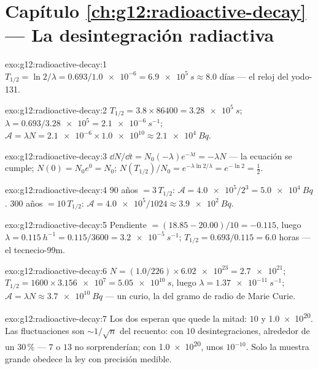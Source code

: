 \section*{Capítulo \ref{ch:g12:radioactive-decay} --- La desintegración radiactiva}

\begin{solution}{exo:g12:radioactive-decay:1}
$T_{1/2} = \ln 2/\lambda = 0.693/\num{1.0e-6} = \qty{6.9e5}{s} \approx
8.0$ días --- el reloj del yodo-131.
\end{solution}

\begin{solution}{exo:g12:radioactive-decay:2}
$T_{1/2} = 3.8 \times \num{86400} = \qty{3.28e5}{s}$;
$\lambda = 0.693/\num{3.28e5} = \qty{2.1e-6}{s^{-1}}$;
$\mathcal A = \lambda N = \num{2.1e-6} \times \num{1.0e10} \approx
\qty{2.1e4}{Bq}$.
\end{solution}

\begin{solution}{exo:g12:radioactive-decay:3}
$\dd N/\dd t = N_0(-\lambda)e^{-\lambda t} = -\lambda N$ --- la ecuación
se cumple; $N(0) = N_0 e^0 = N_0$;
$N(T_{1/2})/N_0 = e^{-\lambda \ln 2/\lambda} = e^{-\ln 2} = \tfrac12$.
\end{solution}

\begin{solution}{exo:g12:radioactive-decay:4}
$90$ años $= 3\,T_{1/2}$:
$\mathcal A = \num{4.0e5}/2^3 = \qty{5.0e4}{Bq}$. $300$ años
$= 10\,T_{1/2}$: $\mathcal A = \num{4.0e5}/1024 \approx
\qty{3.9e2}{Bq}$.
\end{solution}

\begin{solution}{exo:g12:radioactive-decay:5}
Pendiente $= (18.85 - 20.00)/10 = -0.115$, luego
$\lambda = \qty{0.115}{h^{-1}} = 0.115/3600 = \qty{3.2e-5}{s^{-1}}$;
$T_{1/2} = 0.693/0.115 = 6.0$ horas --- el tecnecio-99m.
\end{solution}

\begin{solution}{exo:g12:radioactive-decay:6}
$N = (1.0/226) \times \num{6.02e23} = \num{2.7e21}$;
$T_{1/2} = 1600 \times \num{3.156e7} = \qty{5.05e10}{s}$, luego
$\lambda = \qty{1.37e-11}{s^{-1}}$;
$\mathcal A = \lambda N \approx \qty{3.7e10}{Bq}$ --- un curio, la
 del gramo de radio de Marie Curie.
\end{solution}

\begin{solution}{exo:g12:radioactive-decay:7}
Los dos esperan que quede la mitad: $10$ y \num{1.0e20}. Las
fluctuaciones son $\sim 1/\sqrt{n}$ del recuento: con $10$
desintegraciones, alrededor de un $30\,\%$ --- $7$ o $13$ no
sorprenderían; con \num{1.0e20}, unos $10^{-10}$. Solo la muestra grande
obedece la ley con precisión medible.
\end{solution}

